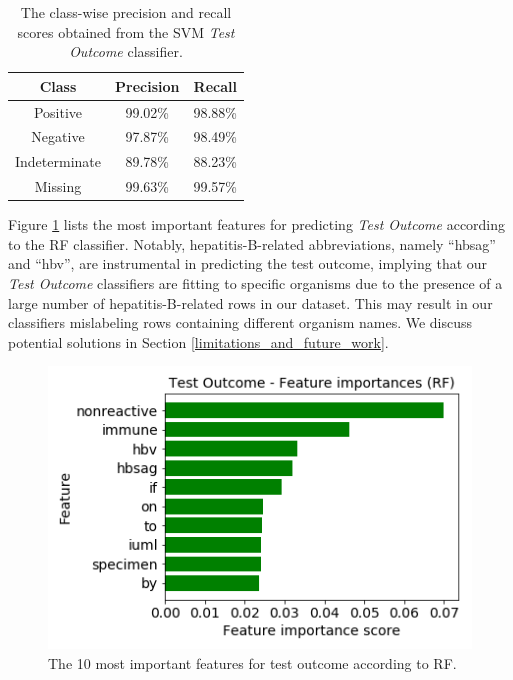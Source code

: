 \documentclass[sigconf]{acmart}
\begin{document}
\begin{table}
    \caption{The class-wise precision and recall scores obtained from the SVM \textit{Test Outcome} classifier.}
    \label{tab:4cto_svm_summary}
    
    \begin{tabular}{ccc}
        \toprule
        Class & Precision & Recall \\
        \midrule
        Positive & 99.02\% & 98.88\% \\
        Negative & 97.87\% & 98.49\% \\
        Indeterminate & 89.78\% & 88.23\% \\
        Missing & 99.63\% & 99.57\% \\
        \bottomrule
    \end{tabular}
\end{table}

Figure \ref{fig:4cto_rf_features} lists the most important features for predicting \textit{Test Outcome} according to the RF classifier. Notably, hepatitis-B-related abbreviations, namely ``hbsag'' and ``hbv'', are instrumental in predicting the test outcome, implying that our \textit{Test Outcome} classifiers are fitting to specific organisms due to the presence of a large number of hepatitis-B-related rows in our dataset. This may result in our classifiers mislabeling rows containing different organism names. We discuss potential solutions in Section \ref{limitations_and_future_work}.

\begin{figure}
    \centering
    \includegraphics[width=\linewidth]{4cto_rf_features.png}
    \caption{The 10 most important features for test outcome according to RF.}
    \label{fig:4cto_rf_features}
\end{figure}
\end{document}
